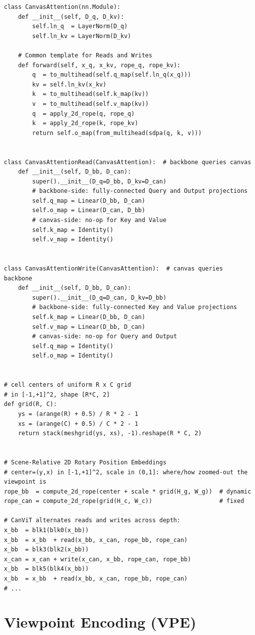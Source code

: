 \documentclass{article}
\begin{document}
\begin{lstlisting}[style=canvitpython]
class CanvasAttention(nn.Module):
    def __init__(self, D_q, D_kv):
        self.ln_q  = LayerNorm(D_q)
        self.ln_kv = LayerNorm(D_kv)

    # Common template for Reads and Writes
    def forward(self, x_q, x_kv, rope_q, rope_kv):
        q  = to_multihead(self.q_map(self.ln_q(x_q)))
        kv = self.ln_kv(x_kv)
        k  = to_multihead(self.k_map(kv))
        v  = to_multihead(self.v_map(kv))
        q  = apply_2d_rope(q, rope_q)
        k  = apply_2d_rope(k, rope_kv)
        return self.o_map(from_multihead(sdpa(q, k, v)))


class CanvasAttentionRead(CanvasAttention):  # backbone queries canvas
    def __init__(self, D_bb, D_can):
        super().__init__(D_q=D_bb, D_kv=D_can)
        # backbone-side: fully-connected Query and Output projections
        self.q_map = Linear(D_bb, D_can)
        self.o_map = Linear(D_can, D_bb)
        # canvas-side: no-op for Key and Value
        self.k_map = Identity()
        self.v_map = Identity()


class CanvasAttentionWrite(CanvasAttention):  # canvas queries backbone
    def __init__(self, D_bb, D_can):
        super().__init__(D_q=D_can, D_kv=D_bb)
        # backbone-side: fully-connected Key and Value projections
        self.k_map = Linear(D_bb, D_can)
        self.v_map = Linear(D_bb, D_can)
        # canvas-side: no-op for Query and Output
        self.q_map = Identity()
        self.o_map = Identity()


# cell centers of uniform R x C grid
# in [-1,+1]^2, shape [R*C, 2]
def grid(R, C):
    ys = (arange(R) + 0.5) / R * 2 - 1
    xs = (arange(C) + 0.5) / C * 2 - 1
    return stack(meshgrid(ys, xs), -1).reshape(R * C, 2)


# Scene-Relative 2D Rotary Position Embeddings
# center=(y,x) in [-1,+1]^2, scale in (0,1]: where/how zoomed-out the viewpoint is
rope_bb  = compute_2d_rope(center + scale * grid(H_g, W_g))  # dynamic
rope_can = compute_2d_rope(grid(H_c, W_c))                   # fixed

# CanViT alternates reads and writes across depth:
x_bb  = blk1(blk0(x_bb))
x_bb  = x_bb  + read(x_bb, x_can, rope_bb, rope_can)
x_bb  = blk3(blk2(x_bb))
x_can = x_can + write(x_can, x_bb, rope_can, rope_bb)
x_bb  = blk5(blk4(x_bb))
x_bb  = x_bb  + read(x_bb, x_can, rope_bb, rope_can)
# ...
\end{lstlisting}
\clearpage

\section{Viewpoint Encoding (VPE)}
\label{supp:vpe}
\end{document}
